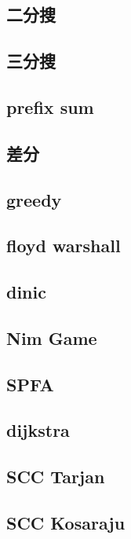     \subsection{二分搜}
        
    \subsection{三分搜}
        
    \subsection{prefix sum}
        
    \subsection{差分}
        
    \subsection{greedy}
        
    \subsection{floyd warshall}
        
    \subsection{dinic}
        
    \subsection{Nim Game}
        
    \subsection{SPFA}
        
    \subsection{dijkstra}
        
    \subsection{SCC Tarjan}
        
    \subsection{SCC Kosaraju}
        
